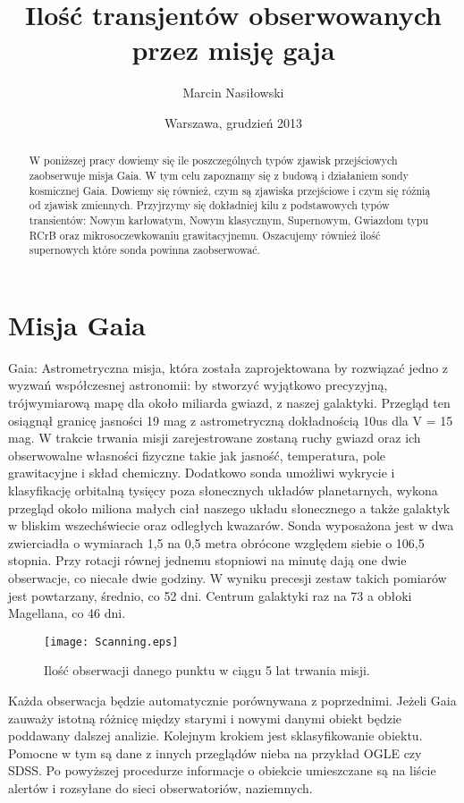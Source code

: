 \documentclass[polish,12pt]{pracamgr}
\author{Marcin Nasiłowski}
\title{Ilość transjentów obserwowanych przez misję gaja}
\date{Warszawa, grudzień 2013}
\begin{document}
\maketitle
\begin{abstract} 
W poniższej pracy dowiemy się ile poszczególnych typów zjawisk przejściowych zaobserwuje misja Gaia. W tym celu zapoznamy się z budową i działaniem sondy kosmicznej Gaia. Dowiemy się również, czym są zjawiska przejściowe i czym się różnią od zjawisk zmiennych. Przyjrzymy się dokładniej kilu z podstawowych typów transientów: Nowym karłowatym, Nowym klasycznym, Supernowym, Gwiazdom typu RCrB oraz mikrosoczewkowaniu grawitacyjnemu. Oszacujemy również ilość supernowych które sonda powinna zaobserwować.
\end{abstract}
\tableofcontents
\listoffigures
\listoftables
\chapter{Misja Gaia}
Gaia: Astrometryczna misja, która została zaprojektowana by rozwiązać jedno z wyzwań współczesnej astronomii: by stworzyć wyjątkowo precyzyjną, trójwymiarową mapę dla około miliarda gwiazd, z naszej galaktyki. Przegląd ten osiągnął granicę jasności 19 mag z astrometryczną dokładnością 10us dla V = 15 mag. W trakcie trwania misji zarejestrowane zostaną ruchy gwiazd oraz ich obserwowalne własności fizyczne takie jak jasność, temperatura, pole grawitacyjne i skład chemiczny. Dodatkowo sonda umożliwi wykrycie i klasyfikację orbitalną tysięcy poza słonecznych układów planetarnych, wykona przegląd około miliona małych ciał naszego układu słonecznego a także galaktyk w bliskim wszechświecie oraz odległych kwazarów.
Sonda wyposażona jest w dwa zwierciadła o wymiarach 1,5 na 0,5 metra obrócone względem siebie o 106,5 stopnia. Przy rotacji równej jednemu stopniowi na minutę dają one dwie obserwacje, co niecałe dwie godziny. W wyniku precesji zestaw takich pomiarów jest powtarzany, średnio, co 52 dni. Centrum galaktyki raz na 73 a obłoki Magellana, co 46 dni. 

\begin{figure}
\centering
\texttt{[image: Scanning.eps]}
\caption{Ilość obserwacji danego punktu w ciągu 5 lat trwania misji. }  
\label{Rys 1 }
\end{figure}
Każda obserwacja będzie automatycznie porównywana z poprzednimi. Jeżeli Gaia zauważy istotną różnicę między starymi i nowymi danymi obiekt będzie poddawany dalszej analizie. Kolejnym krokiem jest sklasyfikowanie obiektu. Pomocne w tym są dane z innych przeglądów nieba na przykład OGLE czy SDSS. Po powyższej procedurze informacje o obiekcie umieszczane są na liście alertów i rozsyłane do sieci obserwatoriów, naziemnych.
\end{document}
